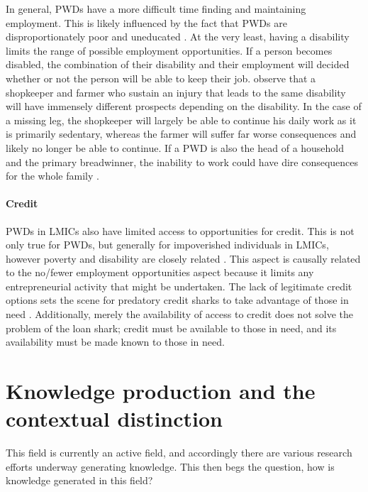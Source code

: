 \documentclass[a4paper]{article}
\begin{document}
In general, PWDs have a more difficult time finding and maintaining
employment.  This is likely influenced by the fact that PWDs are
disproportionately poor and uneducated \cite{lamichhane2014nexus}. At the very
least, having a disability limits the range of possible employment
opportunities. If a person becomes disabled, the combination of their
disability and their employment will decided whether or not the person will be
able to keep their job.  \cite{chowdhury2006economics} observe that a
shopkeeper and farmer who sustain an injury that leads to the same disability
will have immensely different prospects depending on the disability. In the
case of a missing leg, the shopkeeper will largely be able to continue his
daily work as it is primarily sedentary, whereas the farmer will suffer far
worse consequences and likely no longer be able to continue. If a PWD is also
the head of a household and the primary breadwinner, the inability to work
could have dire consequences for the whole family \citep{world2011world}.


\paragraph{Credit}

PWDs in LMICs also have limited access to opportunities for credit. This is
not only true for PWDs, but generally for impoverished individuals in LMICs,
however poverty and disability are closely related
\citep{palmer2011disability}. This aspect is causally related to the no/fewer
employment opportunities aspect because it limits any entrepreneurial activity
that might be undertaken. The lack of legitimate credit options sets the scene
for predatory credit sharks to take advantage of those in need
\citep{beisland2017exploring}. Additionally, merely the availability of access
to credit does not solve the problem of the loan shark; credit must be
available to those in need, and its availability must be made known to those
in need.





\newpage
\section{Knowledge production and the contextual distinction}

This field is currently an active field, and accordingly there are various
research efforts underway generating knowledge. This then begs the question,
how is knowledge generated in this field?  
\end{document}
